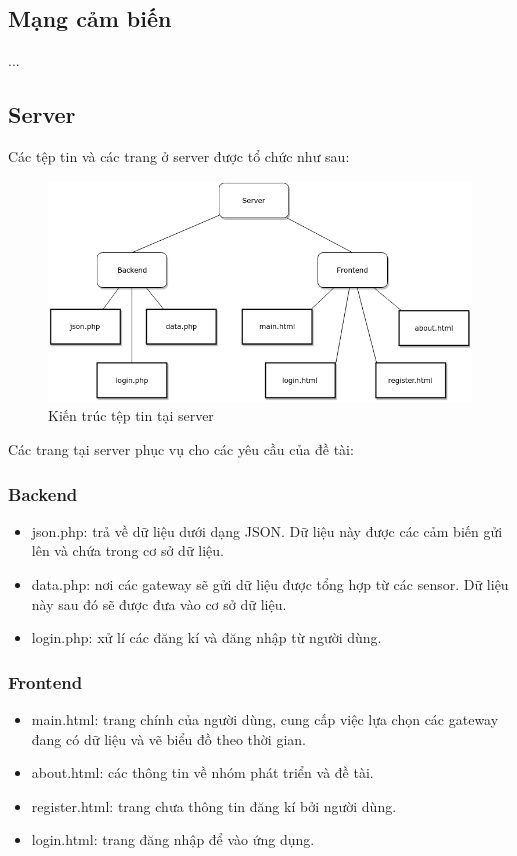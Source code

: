 \documentclass[a4paper]{article}
\begin{document}
	\subsection{Mạng cảm biến}
	...
	
	\subsection{Server}
	Các tệp tin và các trang ở server được tổ chức như sau:
	\begin{figure}[htp]
	    \centering
	    \includegraphics[scale=0.5]{serverStructure.png}
	    \caption{Kiến trúc tệp tin tại server}
	    \label{fig:my_label}
	\end{figure}
	Các trang tại server phục vụ cho các yêu cầu của đề tài:
	    \subsubsection{Backend}
	        \begin{itemize}
	            \item json.php: trả về dữ liệu dưới dạng JSON. Dữ liệu này được các cảm biến gửi lên và chứa trong cơ sở dữ liệu.
	           \item data.php: nơi các gateway sẽ gửi dữ liệu được tổng hợp từ các sensor. Dữ liệu này sau đó sẽ được đưa vào cơ sở dữ liệu.
	           \item login.php: xử lí các đăng kí và đăng nhập từ người dùng.
	        \end{itemize}
	   \subsubsection{Frontend}
	        \begin{itemize}
	            \item main.html: trang chính của người dùng, cung cấp việc lựa chọn các gateway đang có dữ liệu và vẽ biểu đồ theo thời gian.
	            \item about.html: các thông tin về nhóm phát triển và đề tài.
	            \item register.html: trang chưa thông tin đăng kí bởi người dùng.
	            \item login.html: trang đăng nhập để vào ứng dụng.
	        \end{itemize}
\end{document}

